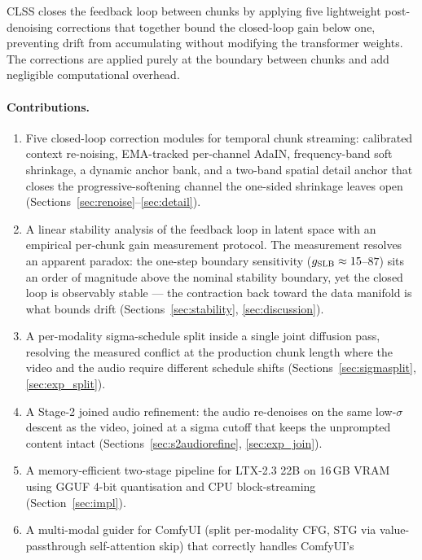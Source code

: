 \documentclass[12pt]{article}
\begin{document}
CLSS closes the feedback loop between chunks by applying five lightweight
post-denoising corrections that together bound the closed-loop gain below one,
preventing drift from accumulating without modifying the transformer weights.
The corrections are applied purely at the boundary between chunks and add
negligible computational overhead.

\paragraph{Contributions.}
\begin{enumerate}[leftmargin=*,noitemsep]
\item Five closed-loop correction modules for temporal chunk streaming:
      calibrated context re-noising, EMA-tracked per-channel AdaIN,
      frequency-band soft shrinkage, a dynamic anchor bank, and a two-band
      spatial detail anchor that closes the progressive-softening channel the
      one-sided shrinkage leaves open
      (Sections~\ref{sec:renoise}--\ref{sec:detail}).
\item A linear stability analysis of the feedback loop in latent space with an
      empirical per-chunk gain measurement protocol.  The measurement
      resolves an apparent paradox: the one-step boundary sensitivity
      ($g_{\rm SLB}\approx15$--$87$) sits an order of magnitude above the
      nominal stability boundary, yet the closed loop is observably stable ---
      the contraction back toward the data manifold is what bounds drift
      (Sections~\ref{sec:stability}, \ref{sec:discussion}).
\item A per-modality sigma-schedule split inside a single joint diffusion pass,
      resolving the measured conflict at the production chunk length where the
      video and the audio require different schedule shifts
      (Sections~\ref{sec:sigmasplit}, \ref{sec:exp_split}).
\item A Stage-2 joined audio refinement: the audio re-denoises on the same
      low-$\sigma$ descent as the video, joined at a sigma cutoff that keeps
      the unprompted content intact (Sections~\ref{sec:s2audiorefine},
      \ref{sec:exp_join}).
\item A memory-efficient two-stage pipeline for LTX-2.3 22B on 16\,GB VRAM
      using GGUF 4-bit quantisation and CPU block-streaming
      (Section~\ref{sec:impl}).
\item A multi-modal guider for ComfyUI (split per-modality CFG, STG via
      value-passthrough self-attention skip) that correctly handles ComfyUI's

\end{enumerate}
\end{document}
